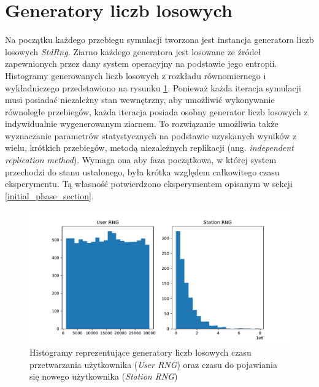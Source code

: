 \newpage
\section{Generatory liczb losowych}
Na początku każdego przebiegu symulacji tworzona jest instancja generatora liczb losowych \emph{StdRng}.
Ziarno każdego generatora jest losowane ze źródeł zapewnionych przez dany system operacyjny na podstawie jego entropii. Histogramy generowanych liczb losowych z rozkładu równomiernego i wykładniczego przedstawiono na rysunku \ref{rng_hist}.
Ponieważ każda iteracja symulacji musi posiadać niezależny stan wewnętrzny, aby umożliwić wykonywanie równoległe przebiegów, każda iteracja posiada osobny generator liczb losowych z indywidualnie wygenerowanym ziarnem. To rozwiązanie umożliwia także wyznaczanie parametrów statystycznych na podstawie uzyskanych wyników z wielu, krótkich przebiegów, metodą niezależnych replikacji (ang. \emph{independent replication method}). Wymaga ona aby faza początkowa, w której system przechodzi do stanu ustalonego, była krótka względem całkowitego czasu eksperymentu. Tą własność potwierdzono eksperymentem opisanym w sekcji \ref{initial_phase_section}.

\begin{figure}[h]
\center
\includegraphics[scale=0.65]{img/rng.pdf} 
\caption{Histogramy reprezentujące generatory liczb losowych czasu przetwarzania użytkownika (\emph{User RNG}) oraz czasu do pojawiania się nowego użytkownika (\emph{Station RNG})}
\label{rng_hist}
\end{figure}